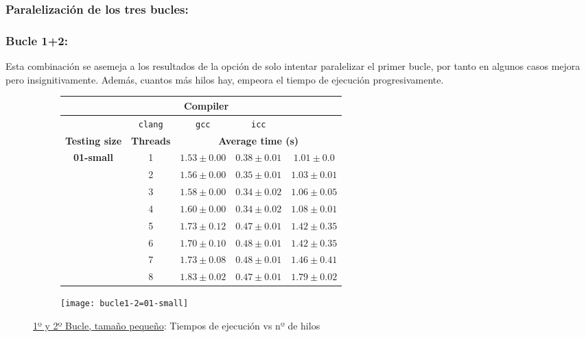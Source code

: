 
\subsubsection{\textbf{Paralelización de los tres bucles:}}
\subsubsection{\textbf{Bucle 1+2:}}
\par Esta combinación se asemeja a los resultados de la opción de solo intentar paralelizar el primer 
bucle, por tanto en algunos casos mejora pero insignitivamente. Además, cuantos más hilos hay, empeora 
el tiempo de ejecución progresivamente.
\begin{figure}[H]
    \centering
    \begin{subfigure}{0.4\textwidth}
        \begin{adjustbox}{width=\textwidth} 
        \begin{tabular}{|c|c|c|c|c|}
            \hline
            \rowcolor{azul} \multicolumn{2}{|c|}{}&\multicolumn{3}{c|}{\textbf{Compiler}} \\ \hline
            \rowcolor{azul} \multicolumn{2}{|c|}{}&\texttt{clang}&\texttt{gcc}&\texttt{icc}\\ \hline
            \rowcolor{azul} \textbf{Testing size} & \textbf{Threads}&\multicolumn{3}{c|}{\textbf{Average time (s)}} \\ \hline
            \multirow{8}{1cm}{\textbf{01-small}} & 1 & \(1.53\pm{0.00}\) & \(0.38\pm{0.01}\) & \(1.01\pm{0.0}\) \\ \cline{2-5}
            & 2 & \(1.56\pm{0.00}\) & \(0.35\pm{0.01}\) & \(1.03\pm{0.01}\) \\ \cline{2-5}
            & 3 & \(1.58\pm{0.00}\) & \(0.34\pm{0.02}\) & \(1.06\pm{0.05}\) \\ \cline{2-5}
            & 4 & \(1.60\pm{0.00}\) & \(0.34\pm{0.02}\) & \(1.08\pm{0.01}\) \\ \cline{2-5}
            & 5 & \(1.73\pm{0.12}\) & \(0.47\pm{0.01}\) & \(1.42\pm{0.35}\) \\ \cline{2-5}
            & 6 & \(1.70\pm{0.10}\) & \(0.48\pm{0.01}\) & \(1.42\pm{0.35}\) \\ \cline{2-5}
            & 7 & \(1.73\pm{0.08}\) & \(0.48\pm{0.01}\) & \(1.46\pm{0.41}\) \\ \cline{2-5}
            & 8 & \(1.83\pm{0.02}\) & \(0.47\pm{0.01}\) & \(1.79\pm{0.02}\) \\ \hline
        \end{tabular}
        \end{adjustbox}
    \end{subfigure}
    \hfill
    \begin{subfigure}{0.5\textwidth}
        \texttt{[image: bucle1-2=01-small]}
    \end{subfigure}
    \caption{\underline{1º y 2º Bucle, tamaño pequeño}: Tiempos de ejecución vs nº de hilos}
    \label{fig:bucle1-2=01-small}
\end{figure}

